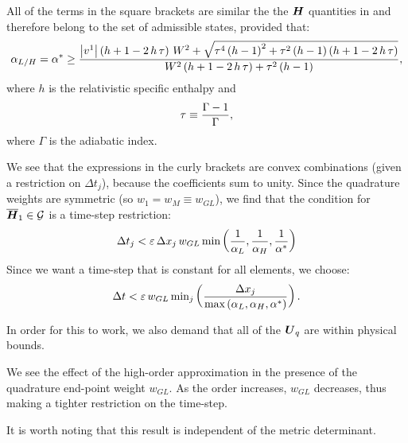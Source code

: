 All of the terms in the square brackets are similar the the $\boldsymbol{H}$ quantities in \citet{Qin2016} and therefore belong to the set of admissible states, provided that:
\begin{equation}
    \alpha_{L/H}=\alpha^{*}\geq\frac{\left|v^{1}\right|\left(h+1-2\,h\,\tau\right)\,W^{2}+\sqrt{\tau^{4}\left(h-1\right)^{2}+\tau^{2}\left(h-1\right)\left(h+1-2\,h\,\tau\right)}}{W^{2}\left(h+1-2\,h\,\tau\right)+\tau^{2}\left(h-1\right)},
\end{equation}
where $h$ is the relativistic specific enthalpy and
\begin{equation}
    \tau\equiv\frac{\Gamma-1}{\Gamma},
\end{equation}
where $\Gamma$ is the adiabatic index.

We see that the expressions in the curly brackets are convex combinations (given a restriction on $\Delta t_{j}$), because the coefficients sum to unity. Since the quadrature weights are symmetric (so $w_{1}=w_{M}\equiv w_{GL}$), we find that the condition for $\overline{\boldsymbol{H}}_{1}\in\mathcal{G}$ is a time-step restriction:
\begin{equation}
\Delta t_{j}<\varepsilon\,\Delta x_{j}\,w_{GL}\,\text{min}\left(\frac{1}{\alpha_{L}},\frac{1}{\alpha_{H}},\frac{1}{\alpha^{*}}\right)
\end{equation}
Since we want a time-step that is constant for all elements, we choose:
\begin{equation}
\Delta t<\varepsilon\,w_{GL}\,\text{min}_{j}\left(\frac{\Delta x_{j}}{\text{max}\left(\alpha_{L},\alpha_{H},\alpha^{*}\right)}\right).
\end{equation}

 In order for this to work, we also demand that all of the $\boldsymbol{U}_{q}$ are within physical bounds.

 We see the effect of the high-order approximation in the presence of the quadrature end-point weight $w_{GL}$. As the order increases, $w_{GL}$ decreases, thus making a tighter restriction on the time-step.

 It is worth noting that this result is independent of the metric determinant.
